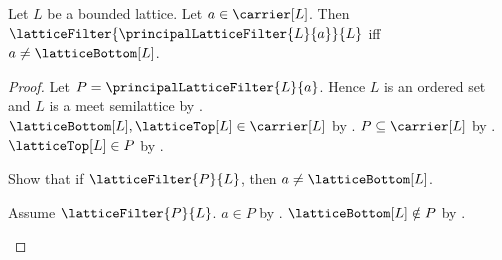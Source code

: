 \begin{theorem}\label{principal_lattice_filter_is_filter_iff_nonbottom}
    Let $L$ be a bounded lattice.
    Let $a\in\carrier[L]$.
    Then $\latticeFilter{\principalLatticeFilter{L}{a}}{L}$ iff
        $a\neq\latticeBottom[L]$.
\end{theorem}
\begin{proof}
    Let $P=\principalLatticeFilter{L}{a}$.
    Hence $L$ is an ordered set and $L$ is a meet semilattice by
        .
    $\latticeBottom[L],\latticeTop[L]\in\carrier[L]$ by
        .
    $P\subseteq\carrier[L]$ by
        .
    $\latticeTop[L]\in P$ by
        .

    Show that if $\latticeFilter{P}{L}$, then
        $a\neq\latticeBottom[L]$.
    \begin{subproof}
        Assume $\latticeFilter{P}{L}$.
        $a\in P$ by
            .
        $\latticeBottom[L]\notin P$ by
            .
    \end{subproof}


\end{proof}
